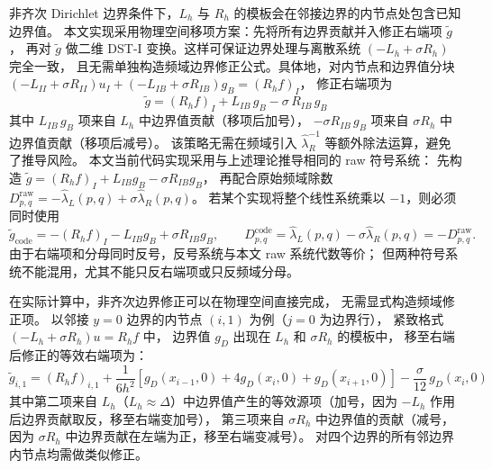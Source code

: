 \begin{remark}[物理空间边界修正策略]
  \label{rem:Rh_boundary_freq}
  非齐次 Dirichlet 边界条件下，$L_h$ 与 $R_h$ 的模板会在邻接边界的内节点处包含已知边界值。
  本文实现采用物理空间移项方案：先将所有边界贡献并入修正右端项 $\tilde{g}$，
  再对 $\tilde{g}$ 做二维 DST-I 变换。这样可保证边界处理与离散系统 $(-L_h+\sigma R_h)$ 完全一致，
  且无需单独构造频域边界修正公式。具体地，对内节点和边界值分块
  $(-L_{II}+\sigma R_{II})u_I + (-L_{IB}+\sigma R_{IB})g_B = (R_h f)_I$，
  修正右端项为
  \begin{equation}
    \tilde{g} = (R_h f)_I + L_{IB}\,g_B - \sigma\,R_{IB}\,g_B
    \label{eq:bnd_correction_general}
  \end{equation}
  其中 $L_{IB}\,g_B$ 项来自 $L_h$ 中边界值贡献（移项后加号），
  $-\sigma R_{IB}\,g_B$ 项来自 $\sigma R_h$ 中边界值贡献（移项后减号）。
  该策略无需在频域引入 $\hat{\lambda}_R^{-1}$ 等额外除法运算，避免了推导风险。
  本文当前代码实现采用与上述理论推导相同的 raw 符号系统：
  先构造
  $\tilde g=(R_h f)_I+L_{IB}g_B-\sigma R_{IB}g_B$，
  再配合原始频域除数
  $D_{p,q}^{\mathrm{raw}}=-\hat{\lambda}_L(p,q)+\sigma\hat{\lambda}_R(p,q)$。
  若某个实现将整个线性系统乘以 $-1$，则必须同时使用
  \[
    \tilde g_{\mathrm{code}}
    =
    -(R_hf)_I-L_{IB}g_B+\sigma R_{IB}g_B,
    \qquad
    D_{p,q}^{\mathrm{code}}
    =
    \hat{\lambda}_L(p,q)-\sigma\hat{\lambda}_R(p,q)
    =
    -D_{p,q}^{\mathrm{raw}}.
  \]
  由于右端项和分母同时反号，反号系统与本文 raw 系统代数等价；
  但两种符号系统不能混用，尤其不能只反右端项或只反频域分母。
\end{remark}

\begin{remark}[物理空间中的边界修正计算]
  在实际计算中，非齐次边界修正可以在物理空间直接完成，
  无需显式构造频域修正项。
  以邻接 $y=0$ 边界的内节点 $(i,1)$ 为例（$j=0$ 为边界行），
  紧致格式 $(-L_h+\sigma R_h)u = R_h f$ 中，
  边界值 $g_D$ 出现在 $L_h$ 和 $\sigma R_h$ 的模板中，
  移至右端后修正的等效右端项为：
  \begin{equation}
    \tilde{g}_{i,1} = (R_h f)_{i,1} + \frac{1}{6h^2}\left[g_D(x_{i-1},0)+4g_D(x_i,0)+g_D(x_{i+1},0)\right]
    - \frac{\sigma}{12}\,g_D(x_i, 0)
    \label{eq:bnd_correction}
  \end{equation}
  其中第二项来自 $L_h$（$L_h \approx \Delta$）中边界值产生的等效源项（加号，因为 $-L_h$ 作用后边界贡献取反，移至右端变加号），
  第三项来自 $\sigma R_h$ 中边界值的贡献（减号，因为 $\sigma R_h$ 中边界贡献在左端为正，移至右端变减号）。
  对四个边界的所有邻边界内节点均需做类似修正。
\end{remark}

